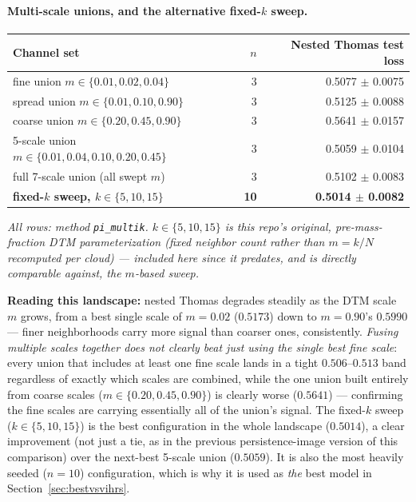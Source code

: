 \documentclass[11pt]{article}
\begin{document}
\paragraph{Multi-scale unions, and the alternative fixed-$k$ sweep.}
\begin{center}
\begin{tabular}{@{}lrr@{}}
\toprule
\textbf{Channel set} & \textbf{$n$} & \textbf{Nested Thomas test loss} \\
\midrule
fine union $m\in\{0.01,0.02,0.04\}$              & 3  & 0.5077 $\pm$ 0.0075 \\
spread union $m\in\{0.01,0.10,0.90\}$            & 3  & 0.5125 $\pm$ 0.0088 \\
coarse union $m\in\{0.20,0.45,0.90\}$            & 3  & 0.5641 $\pm$ 0.0157 \\
5-scale union $m\in\{0.01,0.04,0.10,0.20,0.45\}$ & 3  & 0.5059 $\pm$ 0.0104 \\
full 7-scale union (all swept $m$)               & 3  & 0.5102 $\pm$ 0.0083 \\
\midrule
\textbf{fixed-$k$ sweep, $k\in\{5,10,15\}$}       & \textbf{10} & \textbf{0.5014 $\pm$ 0.0082} \\
\bottomrule
\end{tabular}
\end{center}
\emph{All rows: method \texttt{pi\_multik}. $k\in\{5,10,15\}$ is this repo's
original, pre-mass-fraction DTM parameterization (fixed neighbor count rather
than $m=k/N$ recomputed per cloud) — included here since it predates, and is
directly comparable against, the $m$-based sweep.}

\textbf{Reading this landscape:} nested Thomas degrades steadily as the DTM
scale $m$ grows, from a best single scale of $m=0.02$ ($0.5173$) down to
$m=0.90$'s $0.5990$ — finer neighborhoods carry more signal than coarser ones,
consistently. \emph{Fusing multiple scales together does not clearly beat
just using the single best fine scale}: every union that includes at least
one fine scale lands in a tight $0.506$--$0.513$ band regardless of exactly
which scales are combined, while the one union built entirely from coarse
scales ($m\in\{0.20,0.45,0.90\}$) is clearly worse ($0.5641$) — confirming the
fine scales are carrying essentially all of the union's signal. The
fixed-$k$ sweep ($k\in\{5,10,15\}$) is the best configuration in the whole
landscape ($0.5014$), a clear improvement (not just a tie, as in the previous
persistence-image version of this comparison) over the next-best 5-scale
union ($0.5059$). It is also the most heavily seeded ($n=10$) configuration,
which is why it is used as \emph{the} best model in
Section~\ref{sec:bestvsvihrs}.
\end{document}
